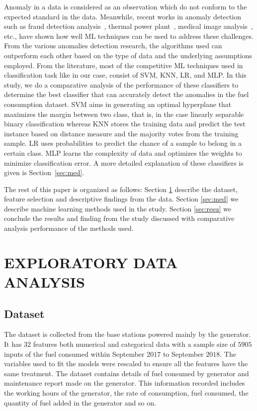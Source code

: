 \documentclass[final,5p,times,twocolumn,authoryear]{elsarticle}
\begin{document}
Anomaly in a data is considered as an observation which do not conform to the expected standard in the data. Meanwhile, recent works in anomaly detection such as fraud detection analysis~\citep{2017arXiv170601953Z, chouiekh2018convnets}, 
thermal power plant~\citep{banjanovic2017neural}, medical image analysis~\citep{taboada2009anomaly}, etc., have shown how well ML techniques can be used to address these challenges.
From the various anomalies detection research, the algorithms used can outperform each other based on the type of data 
and the underlying assumptions employed. From the literature, most of the competitive ML techniques used in classification task like in our case, consist of SVM, KNN, LR, and MLP. In this study, we do a comparative analysis of the performance of these classifiers to determine the best classifier that can accurately detect the anomalies in the fuel consumption dataset. SVM aims in generating an optimal hyperplane that maximizes the margin between two class, that is, in the case linearly separable binary classification whereas KNN  stores the training data and predict the test instance based on distance measure and the majority votes from the training sample. LR uses probabilities to predict the chance of a sample to belong in a certain class. MLP learns the complexity of data and optimizes the weights to minimize classification error. A more detailed explanation of these classifiers is given is Section~\ref{sec:med}.
 
The rest of this paper is organized as follows: Section \ref{sec:expl} describe the dataset, feature selection and descriptive findings from the data. Section \ref{sec:med} we describe machine learning methods used in the study. Section \ref{sec:resu} we conclude the results and finding from the study discussed with comparative analysis performance of the methods used.



\section{EXPLORATORY DATA ANALYSIS}  \label{sec:expl}

\subsection{Dataset} \label{sec:desc}

The dataset is collected from the base stations powered mainly by the generator. It has 32 features both numerical and categorical data with a sample size of $5905$ inputs of the fuel consumed within September $2017$ to September $2018$. The variables used to fit the models were rescaled to ensure all the features have the same treatment. The dataset contains details of fuel consumed by generator and maintenance report made on the generator. This information recorded includes the working hours of the generator, the rate of consumption, fuel consumed, the quantity of fuel added in the generator and so on.
\end{document}
